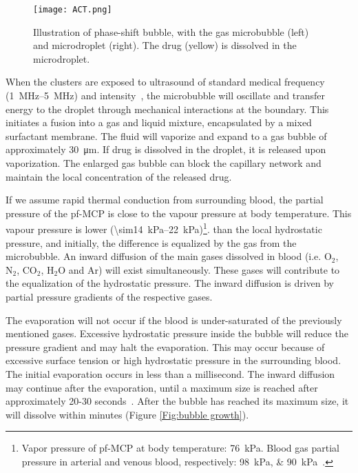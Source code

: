\begin{figure}[h]
  \centering
  \texttt{[image: ACT.png]}
  \caption{Illustration of phase-shift bubble, with the gas microbubble (left) and microdroplet (right). The drug (yellow) is dissolved in the microdroplet.}
  \label{Fig:ACT}
\end{figure}


When the clusters are exposed to ultrasound of standard medical frequency (\SIrange{1}{5}{\mega\hertz}) and intensity~\cite{Hoskins2010}, the microbubble will oscillate and transfer energy to the droplet through mechanical interactions at the boundary. This initiates a fusion into a gas and liquid mixture, encapsulated by a mixed surfactant membrane. The fluid will vaporize and expand to a gas bubble of approximately \SI{30}{\micro\metre}. If drug is dissolved in the droplet, it is released upon vaporization. The enlarged gas bubble can block the capillary network and maintain the local concentration of the released drug.  

If we assume rapid thermal conduction from surrounding blood, the partial pressure of the pf-MCP is close to the vapour pressure at body temperature. This vapour pressure is lower (\SIrange{\sim14}{22}{\kilo\pascal})\footnote{Vapor pressure of pf-MCP at body temperature: \SI{76}{\kilo\pascal}. Blood gas partial pressure in arterial and venous blood, respectively: \SIlist{98;90}{\kilo\pascal}~\cite{Healey2013}.}. than the local hydrostatic pressure, and initially, the difference is equalized by the gas from the microbubble. An inward diffusion of the main gases dissolved in blood (i.e. $\mathrm{O}_2$, $\mathrm{N}_2$, $\mathrm{CO}_2$, $\mathrm{H}_2\mathrm{O}$ and $\mathrm{Ar}$) will exist simultaneously. These gases will contribute to the equalization of the hydrostatic pressure. The inward diffusion is driven by partial pressure gradients of the respective gases. 

The evaporation will not occur if the blood is under-saturated of the previously mentioned gases. Excessive hydrostatic pressure inside the bubble will reduce the pressure gradient and may halt the evaporation. This may occur because of excessive surface tension or high hydrostatic pressure in the surrounding blood. The initial evaporation occurs in less than a millisecond. The inward diffusion may continue after the evaporation, until a maximum size is reached after approximately 20-30 seconds~\cite{Healey_pc}. After the bubble has reached its maximum size, it will dissolve within minutes (Figure \ref{Fig:bubble growth}).

